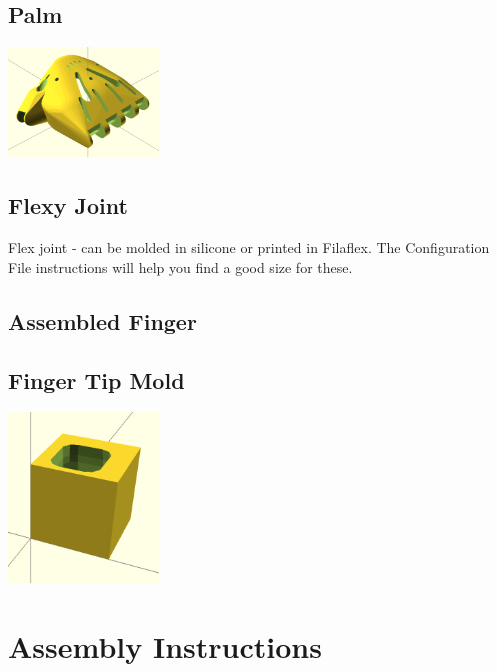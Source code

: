\documentclass[11pt]{article}
\begin{document}
\hypertarget{thing_palm}{\subsection{Palm}}
\includegraphics[width=4cm]{images/palm.png}

\hypertarget{thing_flexy\_joint}{\subsection{Flexy Joint}}
Flex joint - can be molded in silicone or printed in Filaflex. The Configuration File instructions will help you find a good size for these.

\hypertarget{thing_finger\_assembly}{\subsection{Assembled Finger}}

\hypertarget{thing_finger\_tip\_mold}{\subsection{Finger Tip Mold}}
\includegraphics[width=4cm]{images/finger_tip_mold.png}

\newpage

\section{Assembly Instructions}
\end{document}
